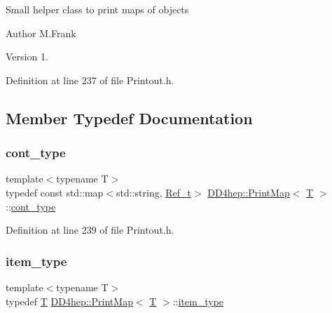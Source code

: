 Small helper class to print maps of objects

\begin{DoxyAuthor}{Author}
M.\+Frank 
\end{DoxyAuthor}
\begin{DoxyVersion}{Version}
1. 
\end{DoxyVersion}


Definition at line 237 of file Printout.\+h.



\subsection{Member Typedef Documentation}
\hypertarget{struct_d_d4hep_1_1_print_map_a75356a94ee86763170e76a2096ec4cb5}{}\label{struct_d_d4hep_1_1_print_map_a75356a94ee86763170e76a2096ec4cb5} 
\subsubsection{\texorpdfstring{cont\+\_\+type}{cont\_type}}
{\footnotesize\ttfamily template$<$typename T$>$ \\
typedef const std\+::map$<$std\+::string, \hyperlink{group___d_d4_h_e_p___g_e_o_m_e_t_r_y_ga40af83be6718bb8828a3d83dc7f8c930}{Ref\+\_\+t}$>$ \hyperlink{struct_d_d4hep_1_1_print_map}{D\+D4hep\+::\+Print\+Map}$<$ \hyperlink{class_t}{T} $>$\+::\hyperlink{struct_d_d4hep_1_1_print_map_a75356a94ee86763170e76a2096ec4cb5}{cont\+\_\+type}}



Definition at line 239 of file Printout.\+h.

\hypertarget{struct_d_d4hep_1_1_print_map_a8d784c171bb184d181296a306cd1301d}{}\label{struct_d_d4hep_1_1_print_map_a8d784c171bb184d181296a306cd1301d} 
\subsubsection{\texorpdfstring{item\+\_\+type}{item\_type}}
{\footnotesize\ttfamily template$<$typename T$>$ \\
typedef \hyperlink{class_t}{T} \hyperlink{struct_d_d4hep_1_1_print_map}{D\+D4hep\+::\+Print\+Map}$<$ \hyperlink{class_t}{T} $>$\+::\hyperlink{struct_d_d4hep_1_1_print_map_a8d784c171bb184d181296a306cd1301d}{item\+\_\+type}}



